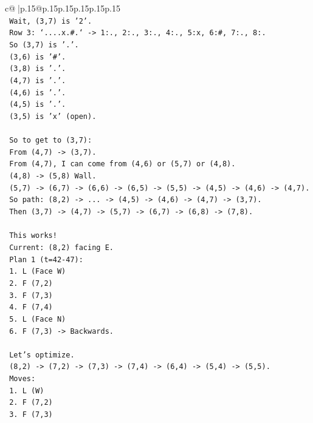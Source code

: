 \documentclass{article}
\begin{document}
{\begin{supertabular}{c@{$\;$}|p{.15\linewidth}@{}p{.15\linewidth}p{.15\linewidth}p{.15\linewidth}p{.15\linewidth}p{.15\linewidth}}
{{{\\ 
\texttt{  Wait, (3,7) is '2'.} \\
\texttt{  Row 3: `....x.\#.` {-}> 1:., 2:., 3:., 4:., 5:x, 6:\#, 7:., 8:.} \\
\texttt{  So (3,7) is '.'.} \\
\texttt{  (3,6) is '\#'.} \\
\texttt{  (3,8) is '.'.} \\
\texttt{  (4,7) is '.'.} \\
\texttt{  (4,6) is '.'.} \\
\texttt{  (4,5) is '.'.} \\
\texttt{  (3,5) is 'x' (open).} \\
\\ 
\texttt{  So to get to (3,7):} \\
\texttt{  From (4,7) {-}> (3,7).} \\
\texttt{  From (4,7), I can come from (4,6) or (5,7) or (4,8).} \\
\texttt{  (4,8) {-}> (5,8) Wall.} \\
\texttt{  (5,7) {-}> (6,7) {-}> (6,6) {-}> (6,5) {-}> (5,5) {-}> (4,5) {-}> (4,6) {-}> (4,7).} \\
\texttt{  So path: (8,2) {-}> ... {-}> (4,5) {-}> (4,6) {-}> (4,7) {-}> (3,7).} \\
\texttt{  Then (3,7) {-}> (4,7) {-}> (5,7) {-}> (6,7) {-}> (6,8) {-}> (7,8).} \\
\\ 
\texttt{  This works!} \\
\texttt{  Current: (8,2) facing E.} \\
\texttt{  Plan 1 (t=42{-}47):} \\
\texttt{  1. L (Face W)} \\
\texttt{  2. F (7,2)} \\
\texttt{  3. F (7,3)} \\
\texttt{  4. F (7,4)} \\
\texttt{  5. L (Face N)} \\
\texttt{  6. F (7,3) {-}> Backwards.} \\
\\ 
\texttt{  Let's optimize.} \\
\texttt{  (8,2) {-}> (7,2) {-}> (7,3) {-}> (7,4) {-}> (6,4) {-}> (5,4) {-}> (5,5).} \\
\texttt{  Moves:} \\
\texttt{  1. L (W)} \\
\texttt{  2. F (7,2)} \\
\texttt{  3. F (7,3)} \\
}}}
\end{supertabular}}
\end{document}
